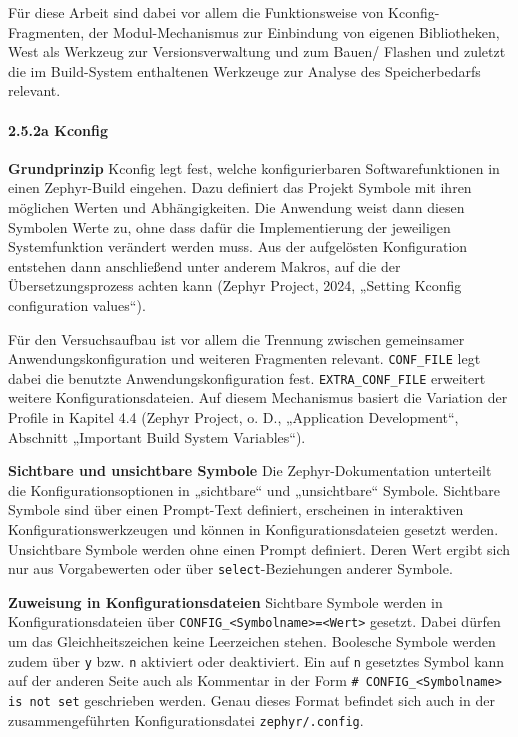Für diese Arbeit sind dabei vor allem die Funktionsweise von Kconfig-Fragmenten, der Modul-Mechanismus zur Einbindung von eigenen Bibliotheken, West als Werkzeug zur Versionsverwaltung und zum Bauen/ Flashen und zuletzt die im Build-System enthaltenen Werkzeuge zur Analyse des Speicherbedarfs relevant.

\paragraph*{\textbf{2.5.2a Kconfig}}
\textbf{Grundprinzip} Kconfig legt fest, welche konfigurierbaren Softwarefunktionen in einen Zephyr-Build eingehen. Dazu definiert das Projekt Symbole mit ihren möglichen Werten und Abhängigkeiten. Die Anwendung weist dann diesen Symbolen Werte zu, ohne dass dafür die Implementierung der jeweiligen Systemfunktion verändert werden muss. Aus der aufgelösten Konfiguration entstehen dann anschließend unter anderem Makros, auf die der Übersetzungsprozess achten kann (Zephyr Project, 2024, „Setting Kconfig configuration values“).

Für den Versuchsaufbau ist vor allem die Trennung zwischen gemeinsamer Anwendungskonfiguration und weiteren Fragmenten relevant. \lstinline[style=fileinline]|CONF_FILE| legt dabei die benutzte Anwendungskonfiguration fest. \lstinline[style=fileinline]|EXTRA_CONF_FILE| erweitert weitere Konfigurationsdateien. Auf diesem Mechanismus basiert die Variation der Profile in Kapitel 4.4 (Zephyr Project, o. D., „Application Development“, Abschnitt „Important Build System Variables“).

\textbf{Sichtbare und unsichtbare Symbole} Die Zephyr-Dokumentation unterteilt die Konfigurationsoptionen in „sichtbare“ und „unsichtbare“ Symbole. Sichtbare Symbole sind über einen Prompt-Text definiert, erscheinen in interaktiven Konfigurationswerkzeugen und können in Konfigurationsdateien gesetzt werden. Unsichtbare Symbole werden ohne einen Prompt definiert. Deren Wert ergibt sich nur aus Vorgabewerten oder über \lstinline[style=fileinline]|select|-Beziehungen anderer Symbole.

\textbf{Zuweisung in Konfigurationsdateien} Sichtbare Symbole werden in Konfigurationsdateien über \lstinline[style=fileinline]|CONFIG_<Symbolname>=<Wert>| gesetzt. Dabei dürfen um das Gleichheitszeichen keine Leerzeichen stehen. Boolesche Symbole werden zudem über \lstinline[style=fileinline]|y| bzw. \lstinline[style=fileinline]|n| aktiviert oder deaktiviert. Ein auf \lstinline[style=fileinline]|n| gesetztes Symbol kann auf der anderen Seite auch als Kommentar in der Form \lstinline[style=fileinline]|# CONFIG_<Symbolname> is not set| geschrieben werden. Genau dieses Format befindet sich auch in der zusammengeführten Konfigurationsdatei \lstinline[style=fileinline]|zephyr/.config|.

